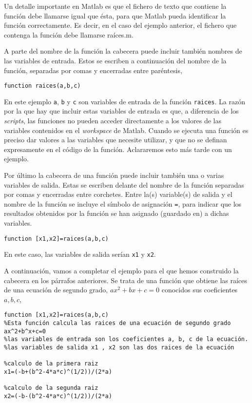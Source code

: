 Un detalle importante en Matlab es que el fichero de texto que contiene la función debe llamarse igual que ésta, para que Matlab pueda identificar la función correctamente. Es decir, en el caso del ejemplo anterior, el fichero que contenga la función debe llamarse raíces.m.

A parte del nombre de la función la cabecera puede incluir también nombres de las variables de entrada. Estos se escriben a continuación del nombre de la función, separadas por comas y encerradas entre paréntesis,

\begin{verbatim}
function raices(a,b,c)
\end{verbatim}

En este ejemplo \texttt{a}, \texttt{b} y \texttt{c} son variables de entrada de la función \texttt{raices}. La razón por la que hay que incluir estas variables de entrada es que, a diferencia de los \emph{scripts}, las funciones no pueden acceder directamente a los valores de las variables contenidos en el \emph{workspace} de Matlab. Cuando se ejecuta una función es preciso dar valores a las variables que necesite utilizar, y que no se definan expresamente en el código de la función. Aclararemos esto más tarde con un ejemplo.

Por último la cabecera de una función puede incluir también una o varias variables de salida. Estas se escriben delante del nombre de la función separadas por comas y encerradas entre corchetes. Entre la(s) variable(s) de salida y el nombre de la función se incluye el símbolo de asignación \texttt{=}, para indicar que los resultados obtenidos por la función se han asignado (guardado en) a dichas variables.

\begin{verbatim}
function [x1,x2]=raices(a,b,c)
\end{verbatim}
  
En este caso, las variables de salida serían \texttt{x1} y \texttt{x2}.

A continuación, vamos a completar el ejemplo para el que hemos construido la cabecera en los párrafos anteriores. Se trata de una función que obtiene las raíces de una ecuación de segundo grado, $ax^2+bx+c=0$ conocidos sus coeficientes $a, b, c$,
\begin{verbatim}
function [x1,x2]=raices(a,b,c)
%Esta función calcula las raices de una ecuación de segundo grado ax^2+b^x+c=0
%las variables de entrada son los coeficientes a, b, c de la ecuación. 
%las variables de salida x1 , x2 son las dos raices de la ecuación

%calculo de la primera raiz
x1=(-b+(b^2-4*a*c)^(1/2))/(2*a)

%calculo de la segunda raiz
x2=(-b-(b^2-4*a*c)^(1/2))/(2*a)
\end{verbatim}

